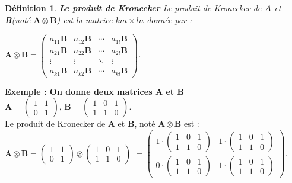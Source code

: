 \documentclass[12pt,openany]{report}
\newtheorem{definition}{\underline{Définition}}
\begin{document}
\begin{definition} \textbf{Le produit de Kronecker }
Le produit de Kronecker de \textbf{A} et \textbf{B}(noté $\mathbf{A}\otimes \mathbf{B}   $) est la matrice $km \times ln$ donnée par :

\begin{center}

$  \mathbf{A}\otimes \mathbf{B} =\begin{pmatrix}
a_{11}\mathbf{B}& a_{12}\mathbf{B}& \cdots&a_{1l}\mathbf{B}\\
a_{21}\mathbf{B}& a_{22}\mathbf{B}& \cdots&a_{2l}\mathbf{B}\\
\vdots & \vdots& \ddots&\vdots\\
a_{k1}\mathbf{B}& a_{k2}\mathbf{B}& \cdots&a_{kl}\mathbf{B}

\end{pmatrix}$.

\end{center}
\end{definition}
\textbf{Exemple : On donne deux matrices $\mathbf{A} $ et $\mathbf{B} $ }\\


$  \mathbf{A} =
\begin{pmatrix}
1&1 \\
0&1
\end{pmatrix}$, $  \mathbf{B} =
\begin{pmatrix}
1&0&1 \\
1&1&0
\end{pmatrix}$.\\
Le produit de Kronecker de $\mathbf{A}$ et $ \mathbf{B}$, noté $ \mathbf{A}\otimes \mathbf{B}$ est : \\

$ \mathbf{A}\otimes \mathbf{B}=
\begin{pmatrix}
1&1 \\
0&1
\end{pmatrix} \otimes  \begin{pmatrix}
1&0&1 \\
1&1&0
\end{pmatrix}$
$  = \begin{pmatrix}
1\cdot \begin{pmatrix}
1&0&1 \\
1&1&0
\end{pmatrix} & 1 \cdot \begin{pmatrix}
1&0&1 \\
1&1&0
\end{pmatrix} \\

0 \cdot \begin{pmatrix}
1&0&1 \\
1&1&0
\end{pmatrix} & 1 \cdot\begin{pmatrix}
1&0&1 \\
1&1&0
\end{pmatrix}

\end{pmatrix}   $.\\
\end{document}
